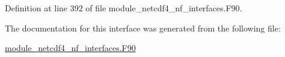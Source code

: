 Definition at line 392 of file module\+\_\+netcdf4\+\_\+nf\+\_\+interfaces.\+F90.



The documentation for this interface was generated from the following file\+:\begin{DoxyCompactItemize}
\item 
\hyperlink{module__netcdf4__nf__interfaces_8F90}{module\+\_\+netcdf4\+\_\+nf\+\_\+interfaces.\+F90}\end{DoxyCompactItemize}
